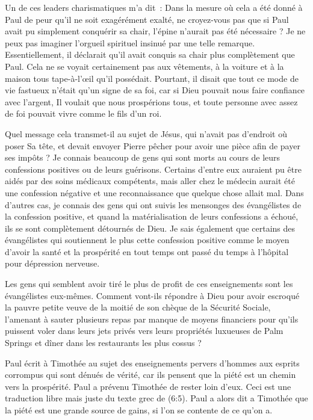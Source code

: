 Un de ces leaders charismatiques m'a dit~:
 \og Dans la mesure où cela a été donné à Paul de peur
 qu'il ne soit exagérément exalté, ne croyez-vous pas que si Paul
 avait pu simplement conquérir sa chair, l'épine n'aurait pas
 été nécessaire ? \fg{}
 Je ne peux pas imaginer l'orgueil spirituel insinué par une telle remarque.
 Essentiellement, il déclarait qu'il avait conquis sa chair
 plus complètement que Paul. Cela ne se voyait certainement pas
 aux vêtements, à la voiture et à la maison tous tape-à-l'œil
 qu'il possédait. Pourtant, il disait que tout ce mode de vie
 fastueux n'était qu'un signe de sa foi, car si Dieu pouvait nous faire
 confiance avec l'argent, Il voulait que nous prospérions tous,
 et toute personne avec assez de foi pouvait vivre comme le fils d'un roi.

Quel message cela transmet-il au sujet de Jésus, qui n'avait pas
 d'endroit où poser Sa tête, et devait envoyer Pierre pêcher
 pour avoir une pièce afin de payer ses impôts ? Je connais beaucoup de gens
 qui sont morts au cours de leurs confessions positives ou de leurs guérisons.
 Certains d'entre eux auraient pu être aidés par des soins médicaux
 compétents, mais aller chez le médecin aurait été une confession négative
 et une reconnaissance que quelque chose allait mal.
 Dans d'autres cas, je connais des gens qui ont suivis les mensonges
 des évangélistes de la confession positive, et quand la matérialisation
 de leurs confessions a échoué, ils se sont complètement détournés de Dieu.
 Je sais également que certains des évangélistes qui soutiennent
 le plus cette confession positive comme le moyen d'avoir la santé
 et la prospérité en tout temps ont passé du temps à l'hôpital
 pour dépression nerveuse.

Les gens qui semblent avoir tiré le plus de profit de ces enseignements
 sont les évangélistes eux-mêmes. Comment vont-ils répondre à Dieu
 pour avoir escroqué la pauvre petite veuve de la moitié de son chèque
 de la Sécurité Sociale, l'amenant à sauter plusieurs repas par manque
 de moyens financiers pour qu'ils puissent voler dans leurs jets privés
 vers leurs propriétés luxueuses de Palm Springs et dîner dans les
 restaurants les plus cossus ?

Paul écrit à Timothée au sujet des enseignements pervers \linebreak
 d'hommes aux esprits corrompus qui sont dénués de vérité, car ils pensent
 que la piété est un chemin vers la prospérité.
 Paul a prévenu Timothée de rester loin d'eux.
 Ceci est une traduction libre mais juste du texte grec
 de (6:5).
 Paul a alors dit a Timothée que la piété est une grande source de gains,
 si l'on se contente de ce qu'on a.
\closechapter

